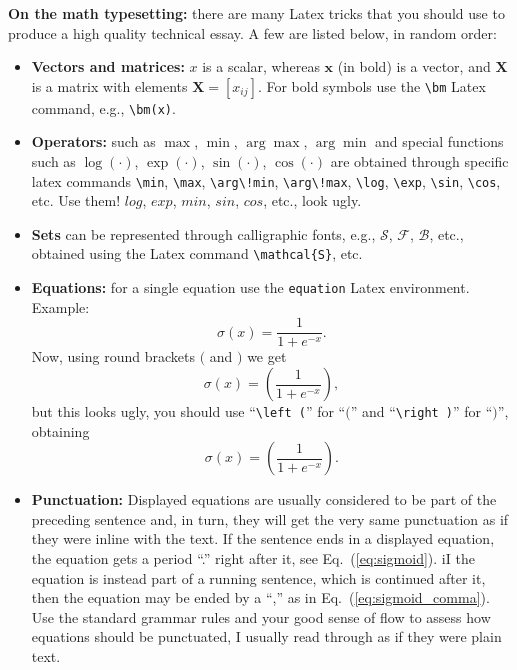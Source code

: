 \textbf{On the math typesetting:} there are many Latex tricks that you should use to produce a high quality technical essay. A few are listed below, in random order:
\begin{itemize}
\item \textbf{Vectors and matrices:} $x$ is a scalar, whereas $\bm{x}$ (in bold) is a vector, and $\bm{X}$ is a matrix with elements $\bm{X} = [x_{ij}]$. For bold symbols use the \texttt{\textbackslash bm} Latex command, e.g., \texttt{\textbackslash bm(x)}.
\item \textbf{Operators:} such as $\max$, $\min$, $\arg\!\max$, $\arg\!\min$ and special functions such as $\log(\cdot)$, $\exp(\cdot)$, $\sin(\cdot)$, $\cos(\cdot)$ are obtained through specific latex commands \texttt{\textbackslash min}, \texttt{\textbackslash max}, \texttt{\textbackslash arg\textbackslash!min}, \texttt{\textbackslash arg\textbackslash!max}, \texttt{\textbackslash log}, \texttt{\textbackslash exp}, \texttt{\textbackslash sin}, \texttt{\textbackslash cos}, etc. Use them! $log$, $exp$, $min$, $sin$, $cos$, etc., look ugly.
\item \textbf{Sets} can be represented through calligraphic fonts, e.g., $\mathcal{S}$, $\mathcal{F}$, $\mathcal{B}$, etc., obtained using the Latex command \texttt{\textbackslash mathcal{\{S\}}}, etc.
\item \textbf{Equations:} for a single equation use the \texttt{equation} Latex environment. Example: 
\begin{equation}
\label{eq:sigmoid}
\sigma(x) = \frac{1}{1+e^{-x}}.
\end{equation} 
Now, using round brackets $($ and $)$ we get
\begin{equation}
\label{eq:sigmoid_comma}
\sigma(x) = (\frac{1}{1+e^{-x}}),
\end{equation} 
but this looks ugly, you should use ``\texttt{\textbackslash left (}'' for ``$($'' and ``\texttt{\textbackslash right )}'' for ``$)$'', obtaining
\begin{equation}
\sigma(x) = \left ( \frac{1}{1+e^{-x}} \right ).
\end{equation} 
\item \textbf{Punctuation:} Displayed equations are usually considered to be part of the preceding sentence and, in turn, they will get the very same punctuation as if they were inline with the text. If the sentence ends in a displayed equation, the equation gets a period ``.'' right after it, see Eq.~(\ref{eq:sigmoid}). iI the equation is instead part of a running sentence, which is continued after it, then the equation may be ended by a ``,'' as in Eq.~(\ref{eq:sigmoid_comma}). Use the standard grammar rules and your good sense of flow to assess how equations should be punctuated, I usually read through as if they were plain text.
\end{itemize} 

